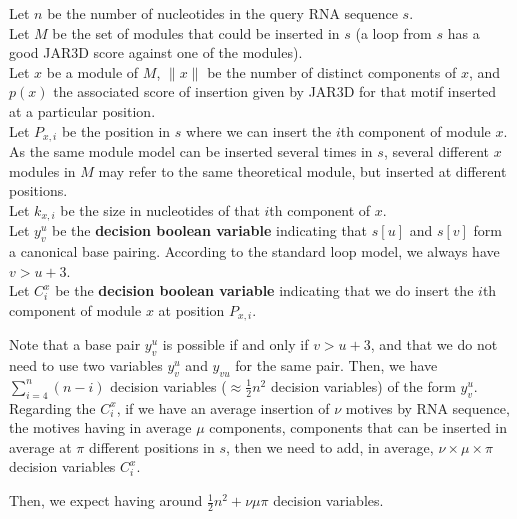 \documentclass{article}
\begin{document}
Let $n$ be the number of nucleotides in the query RNA sequence $s$.\\
Let $M$ be the set of modules that could be inserted in $s$ (a loop from $s$ has a good JAR3D score against one of the modules).\\
Let $x$ be a module of $M$, $\|x\|$ be the number of distinct components of $x$, and $p(x)$ the associated score of insertion given by JAR3D for that motif inserted at a particular position.\\
Let $P_{x,i}$ be the position in $s$ where we can insert the $i$th component of module $x$.\\
As the same module model can be inserted several times in $s$, several different $x$ modules in $M$ may refer to the same theoretical module, but inserted at different positions.\\
Let $k_{x,i}$ be the size in nucleotides of that $i$th component of $x$.\\
Let $y^u_v$ be the \textbf{decision boolean variable} indicating that $s[u]$ and $s[v]$ form a canonical base pairing. According to the standard loop model, we always have $v > u + 3$.\\
Let $C^x_i$ be the \textbf{decision boolean variable} indicating that we do insert the $i$th component of module $x$ at position $P_{x,i}$.
	
	
Note that a base pair $y^u_v$ is possible if and only if $v>u+3$, and that we do not need to use two variables $y^u_v$ and $y_{vu}$ for the same pair. 
Then, we have $\sum_{i=4}^n (n-i)$ decision variables ($\approx \frac{1}{2}n^2$ decision variables) of the form $y^u_v$.
Regarding the $C^x_i$, if we have an average insertion of $\nu$ motives by RNA sequence, the motives having in average $\mu$ components, components that can be inserted in average at $\pi$ different positions in $s$,
then we need to add, in average, $\nu \times \mu \times \pi$ decision variables $C^x_i$.

Then, we expect having around $\frac{1}{2}n^2+\nu \mu \pi$ decision variables.

\newpage
\end{document}
